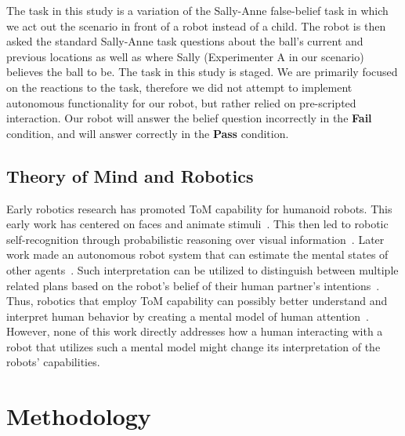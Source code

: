 \documentclass[letterpaper, 10 pt, conference]{ieeeconf}  %
\begin{document}
The task in this study is a variation of the Sally-Anne false-belief task in which we act out the scenario in front of a robot instead of a child. The robot is then asked the standard Sally-Anne task questions about the ball's current and previous locations as well as where Sally (Experimenter A in our scenario) believes the ball to be. The task in this study is staged. We are primarily focused on the reactions to the task, therefore we did not attempt to implement autonomous functionality for our robot, but rather relied on pre-scripted interaction. Our robot will answer the belief question incorrectly in the \textbf{Fail} condition, and will answer correctly in the \textbf{Pass} condition.

\subsection{Theory of Mind and Robotics}


Early robotics research has promoted ToM capability for humanoid robots. This early work has centered on faces and animate stimuli~\cite{scassellati2002theory}. This then led to robotic self-recognition through probabilistic reasoning over visual information~\cite{gold2009using}. Later work made an autonomous robot system that can estimate the mental states of other agents~\cite{devin2016implemented}. Such interpretation can be utilized to distinguish between multiple related plans based on the robot's belief of their human partner's intentions~\cite{hiatt2011accommodating}. Thus, robotics that employ ToM capability can possibly better understand and interpret human behavior by creating a mental model of human attention~\cite{kramer2011theory}. However, none of this work directly addresses how a human interacting with a robot that utilizes such a mental model might change its interpretation of the robots' capabilities.





\section{Methodology} 
\end{document}
